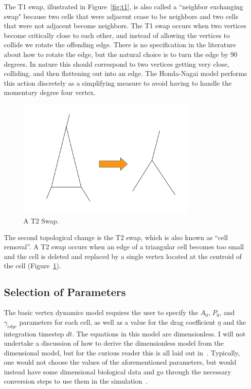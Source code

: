  The T1 swap, illustrated in Figure~\ref{fig:t1}, is also called a ``neighbor exchanging swap" because two cells that were adjacent cease to be neighbors and two cells that were not adjacent become neighbors. The T1 swap occurs when two vertices become critically close to each other, and instead of allowing the vertices to collide we rotate the offending edge. There is no specification in the literature about how to rotate the edge, but the natural choice is to turn the edge by 90 degrees. In nature this should correspond to two vertices getting very close, colliding, and then flattening out into an edge. The Honda-Nagai model performs this action discretely as a simplifying measure to avoid having to handle the momentary degree four vertex.


\begin{figure}
\centering
\includegraphics[width=0.8\textwidth, keepaspectratio]{../diagrams/t2.png}
\caption[A T2 Swap]{A T2 Swap.}
\label{fig:t2}
\end{figure}

The second topological change is the T2 swap, which is also known as ``cell removal''. A T2 swap occurs when an edge of a triangular cell becomes too small and the cell is deleted and replaced by a single vertex located at the centroid of the cell (Figure~\ref{fig:t2}).

\subsection{Selection of Parameters}
The basic vertex dynamics model requires the user to specify the $A_0$, $P_0$, and $\gamma_{edge}$ parameters for each cell, as well as a value for the drag coefficient $\eta$ and the integration timestep $dt$. The equations in this model are dimensionless. I will not undertake a discussion of how to derive the dimensionless model from the dimensional model, but for the curious reader this is all laid out in~\cite{HondaNagai}. Typically, one would not choose the values of the aforementioned parameters, but would instead have some dimensional biological data and go through the necessary conversion steps to use them in the simulation~\cite{NewOkuda}.

